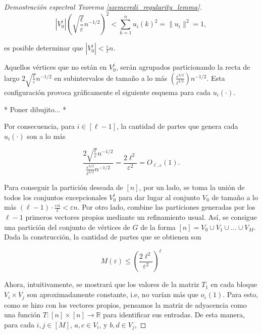 \documentclass{article}[14pts]
\newcommand{\fs}[1]{{\color{blue}* #1 *}}
\providecommand{\norm}[1]{\lVert#1\rVert}
\providecommand{\norm}[1]{\lVert#1\rVert}
\let\varepsilon=\varepsilon
\begin{document}
\begin{proof}[Demostración espectral Teorema \ref{szemeredi_regularity_lemma}]
    \begin{equation*}
        |V_{0}^{i}|\left( \sqrt{\frac{\ell}{\varepsilon}}n^{-1/2}\right)^{2} < \sum_{k=1}^{n} u_{i}(k)^{2} = \norm{u_i}^{2} = 1,
    \end{equation*}\medskip

    es posible determinar que $|V_{0}^{i}| < \frac{\varepsilon}{\ell}n$.\medskip

    Aquellos vértices que no están en $V_{0}^{i}$, serán agrupados particionando la recta de largo $2\sqrt{\frac{\ell}{\varepsilon}}n^{-1/2}$ en subintervalos de tamaño a lo más $\left( \frac{\varepsilon^{3/2}}{\ell^{3/2}}\right)n^{-1/2}$. Esta configuración provoca gráficamente el siguiente esquema para cada $u_i (\cdot)$.\medskip

    \fs{Poner dibujito...}\medskip

    Por consecuencia, para $i\in [\ell -1]$, la cantidad de partes que genera cada $u_{i}(\cdot)$ son a lo más\medskip

    \begin{equation*}
        \frac{
            2\sqrt{\frac{\ell}{\varepsilon}} n^{-1/2}
        }{
            \frac{\varepsilon^{3/2}}{\ell^{3/2}} n^{-1/2}
        } = \frac{2\ell^{2}}{\varepsilon^{2}} = O_{\ell, \varepsilon}(1).
    \end{equation*}\medskip

    
    Para conseguir la partición deseada de $[n]$, por un lado, se toma la unión de todos los conjuntos excepcionales $V_{0}^{i}$ para dar lugar al conjunto $V_0$ de tamaño a lo más $(\ell - 1)\cdot \frac{\varepsilon n}{\ell} < \varepsilon n$. Por otro lado, combine las particiones generadas por los $\ell - 1$ primeros vectores propios mediante un refinamiento usual. Así, se consigue una partición del conjunto de vértices de $G$ de la forma $[n] = V_0 \cup V_1 \cup ...\cup V_{M}$. Dada la construcción, la cantidad de partes que se obtienen son\medskip

    \begin{equation} \label{eq_4 Spectral_Proof}
        M(\varepsilon) \leq \left( \frac{2\ell^{2}}{\varepsilon^{2}}\right)^{\ell}
    \end{equation}\medskip

    Ahora, intuitivamente, se mostrará que los valores de la matriz $T_1$ en cada bloque $V_i \times V_j$ son aproximadamente constante, i.e, no varían más que $o_{\varepsilon}(1)$. Para esto, como se hizo con los vectores propios, pensamos la matriz de adyacencia como una función $T: [n]\times [n]\to \mathbb{R}$ para identificar sus entradas. De esta manera, para cada $i,j\in [M]$, $a,c\in V_i$, y $b,d\in V_j$,\medskip


\end{proof}
\end{document}

